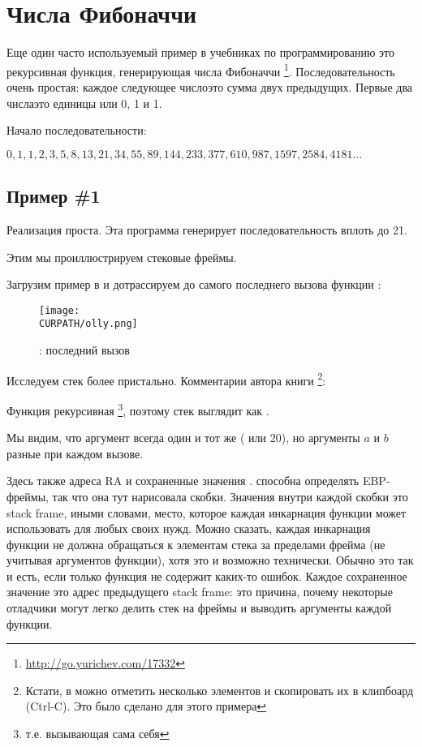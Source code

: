 \chapter{Числа Фибоначчи}

Еще один часто используемый пример в учебниках по программированию это рекурсивная функция,
генерирующая числа Фибоначчи
\footnote{\url{http://go.yurichev.com/17332}}.
Последовательность очень простая: каждое следующее число\EMDASH{}это сумма двух предыдущих.
Первые два числа\EMDASH{}это единицы или 0, 1 и 1.

Начало последовательности:

\begin{center}
$0, 1, 1, 2, 3, 5, 8, 13, 21, 34, 55, 89, 144, 233, 377, 610, 987, 1597, 2584, 4181 ...$
\end{center}

\section{Пример \#1}

Реализация проста. Эта программа генерирует последовательность вплоть до 21.





Этим мы проиллюстрируем стековые фреймы.

\clearpage
Загрузим пример в \olly и дотрассируем до самого последнего вызова функции \ttf{}:

\begin{figure}[H]
\centering
\texttt{[image: \\CURPATH/olly.png]}
\caption{\olly: последний вызов \ttf{}}
\label{fig:fib_olly}
\end{figure}

\clearpage
Исследуем стек более пристально. 
Комментарии автора книги
\footnote{Кстати, в \olly можно отметить несколько элементов и скопировать их в клипбоард (Ctrl-C).
Это было сделано для этого примера}:



Функция рекурсивная
\footnote{т.е. вызывающая сама себя}, 
поэтому стек выглядит как .

Мы видим, что аргумент  всегда один и тот же ( или 20), но аргументы $a$ и $b$ разные при каждом вызове.

Здесь также адреса \ac{RA} и сохраненные значения \EBP.
\olly способна определять EBP-фреймы, так что она тут нарисовала скобки.
Значения внутри каждой скобки это \gls{stack frame}, иными словами, место, которое каждая
инкарнация функции может использовать для любых своих нужд. 
Можно сказать, каждая инкарнация функции не должна обращаться к элементам стека за пределами
фрейма (не учитывая аргументов функции), хотя это и возможно технически. 
Обычно это так и есть, если только функция не содержит каких-то ошибок.
Каждое сохраненное значение \EBP это адрес предыдущего \gls{stack frame}:
это причина, почему некоторые отладчики могут легко делить стек на фреймы и выводить
аргументы каждой функции.

